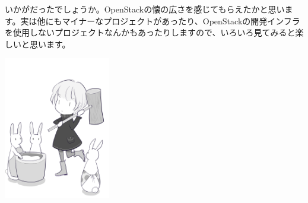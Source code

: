 いかがだったでしょうか。OpenStackの懐の広さを感じてもらえたかと思います。実は他にもマイナーなプロジェクトがあったり、OpenStackの開発インフラを使用しないプロジェクトなんかもあったりしますので、いろいろ見てみると楽しいと思います。

\begin{flushright}
	\includegraphics[width=0.35\textwidth]{img/mochi.png}
\end{flushright}
